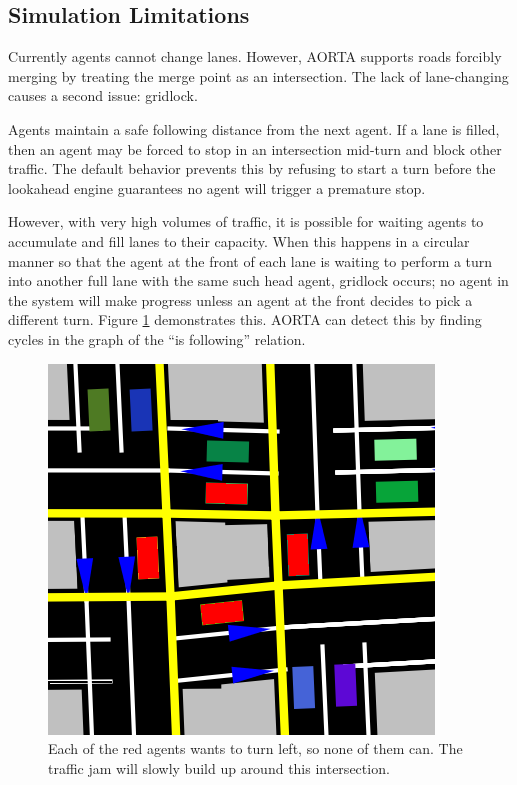 \documentclass[letterpaper, 10 pt, conference]{ieeeconf}  %
\begin{document}
\subsection{Simulation Limitations}

Currently agents cannot change lanes. However, AORTA supports roads forcibly
merging by treating the merge point as an intersection. The lack of
lane-changing causes a second issue: gridlock.

Agents maintain a safe following distance from the next agent. If a lane is
filled, then an agent may be forced to stop in an intersection mid-turn and
block other traffic. The default behavior prevents this by refusing to start a
turn before the lookahead engine guarantees no agent will trigger a premature
stop.

However, with very high volumes of traffic, it is possible for waiting agents to
accumulate and fill lanes to their capacity. When this happens in a circular
manner so that the agent at the front of each lane is waiting to perform a turn
into another full lane with the same such head agent, gridlock \cite{AAAI11-au}
occurs; no agent in the system will make progress unless an agent at the front
decides to pick a different turn. Figure \ref{fig:gridlock} demonstrates this.
AORTA can detect this by finding cycles in the graph of the ``is following''
relation.

\begin{figure}[h]
  \centering \includegraphics[scale=0.25]{gridlock.png}
  \caption{Each of the red agents wants to turn left, so none of them
           can. The traffic jam will slowly build up around this intersection.}
  \label{fig:gridlock}
  \vspace{-10pt}
\end{figure}
\end{document}
